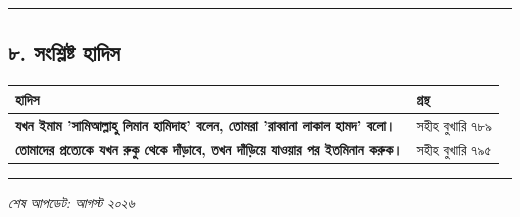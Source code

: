 \medskip\hrule\medskip

\subsection*{৮. সংশ্লিষ্ট হাদিস}

\begin{table}[h]\centering\small
\begin{tabular}{ll}
হাদিস & গ্রন্থ \\
\hline
\textbf{\lat{“}যখন ইমাম 'সামিআল্লাহু লিমান হামিদাহ' বলেন, তোমরা 'রাব্বানা লাকাল হামদ' বলো।\lat{”}} & সহীহ বুখারি ৭৮৯ \\
\textbf{\lat{“}তোমাদের প্রত্যেকে যখন রুকু থেকে দাঁড়াবে, তখন দাঁড়িয়ে যাওয়ার পর ইতমিনান করুক।\lat{”}} & সহীহ বুখারি ৭৯৫ \\
\hline
\end{tabular}
\end{table}

\medskip\hrule\medskip

\textit{শেষ আপডেট: আগস্ট ২০২৬}



